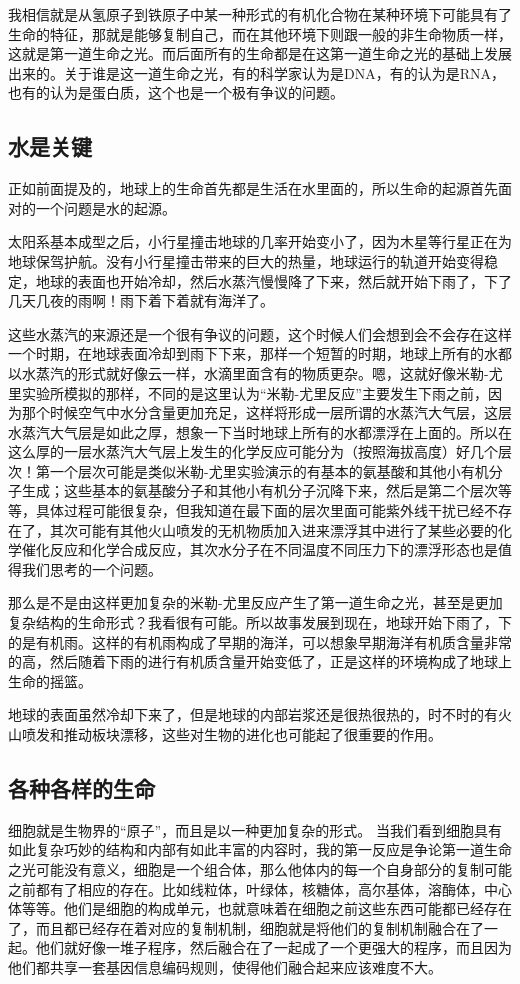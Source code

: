 \documentclass[11pt,oneside]{article}
\begin{document}
我相信就是从氢原子到铁原子中某一种形式的有机化合物在某种环境下可能具有了生命的特征，那就是能够复制自己，而在其他环境下则跟一般的非生命物质一样，这就是第一道生命之光。而后面所有的生命都是在这第一道生命之光的基础上发展出来的。关于谁是这一道生命之光，有的科学家认为是DNA，有的认为是RNA，也有的认为是蛋白质，这个也是一个极有争议的问题。


\subsection{水是关键}
\label{sec-5-2}
正如前面提及的，地球上的生命首先都是生活在水里面的，所以生命的起源首先面对的一个问题是水的起源。

太阳系基本成型之后，小行星撞击地球的几率开始变小了，因为木星等行星正在为地球保驾护航。没有小行星撞击带来的巨大的热量，地球运行的轨道开始变得稳定，地球的表面也开始冷却，然后水蒸汽慢慢降了下来，然后就开始下雨了，下了几天几夜的雨啊！雨下着下着就有海洋了。

这些水蒸汽的来源还是一个很有争议的问题，这个时候人们会想到会不会存在这样一个时期，在地球表面冷却到雨下下来，那样一个短暂的时期，地球上所有的水都以水蒸汽的形式就好像云一样，水滴里面含有的物质更杂。嗯，这就好像米勒-尤里实验所模拟的那样，不同的是这里认为“米勒-尤里反应”主要发生下雨之前，因为那个时候空气中水分含量更加充足，这样将形成一层所谓的水蒸汽大气层，这层水蒸汽大气层是如此之厚，想象一下当时地球上所有的水都漂浮在上面的。所以在这么厚的一层水蒸汽大气层上发生的化学反应可能分为（按照海拔高度）好几个层次！第一个层次可能是类似米勒-尤里实验演示的有基本的氨基酸和其他小有机分子生成；这些基本的氨基酸分子和其他小有机分子沉降下来，然后是第二个层次等等，具体过程可能很复杂，但我知道在最下面的层次里面可能紫外线干扰已经不存在了，其次可能有其他火山喷发的无机物质加入进来漂浮其中进行了某些必要的化学催化反应和化学合成反应，其次水分子在不同温度不同压力下的漂浮形态也是值得我们思考的一个问题。

那么是不是由这样更加复杂的米勒-尤里反应产生了第一道生命之光，甚至是更加复杂结构的生命形式？我看很有可能。所以故事发展到现在，地球开始下雨了，下的是有机雨。这样的有机雨构成了早期的海洋，可以想象早期海洋有机质含量非常的高，然后随着下雨的进行有机质含量开始变低了，正是这样的环境构成了地球上生命的摇篮。

地球的表面虽然冷却下来了，但是地球的内部岩浆还是很热很热的，时不时的有火山喷发和推动板块漂移，这些对生物的进化也可能起了很重要的作用。



\subsection{各种各样的生命}
\label{sec-5-3}
细胞就是生物界的“原子”，而且是以一种更加复杂的形式。 当我们看到细胞具有如此复杂巧妙的结构和内部有如此丰富的内容时，我的第一反应是争论第一道生命之光可能没有意义，细胞是一个组合体，那么他体内的每一个自身部分的复制可能之前都有了相应的存在。比如线粒体，叶绿体，核糖体，高尔基体，溶酶体，中心体等等。他们是细胞的构成单元，也就意味着在细胞之前这些东西可能都已经存在了，而且都已经存在着对应的复制机制，细胞就是将他们的复制机制融合在了一起。他们就好像一堆子程序，然后融合在了一起成了一个更强大的程序，而且因为他们都共享一套基因信息编码规则，使得他们融合起来应该难度不大。
\end{document}
